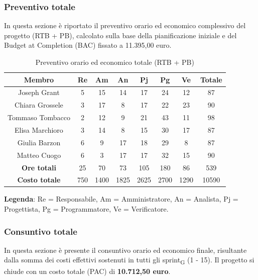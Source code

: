 \documentclass[11pt,a4paper]{article}
\newcommand{\gls}[1]{#1\textsubscript{G}}
\begin{document}
\subsubsection{Preventivo totale}
In questa sezione è riportato il preventivo orario ed economico complessivo del progetto (RTB + PB), calcolato sulla base della pianificazione iniziale e del Budget at Completion (BAC) fissato a 11.395,00 euro.

\begin{table}[H]
    \centering
    \begin{tabular}{|c|c|c|c|c|c|c|c|}
        \hline
        \textbf{Membro} & \textbf{Re} & \textbf{Am} & \textbf{An} & \textbf{Pj} & \textbf{Pg} & \textbf{Ve} & \textbf{Totale} \\
        \hline
        Joseph Grant & 5 & 15 & 14 & 17 & 24 & 12 & 87 \\
        Chiara Grossele & 3 & 17 & 8 & 17 & 22 & 23 & 90 \\
        Tommaso Tombacco & 2 & 12 & 9 & 21 & 43 & 11 & 98 \\
        Elisa Marchioro & 3 & 14 & 8 & 15 & 30 & 17 & 87 \\
        Giulia Barzon & 6 & 9 & 17 & 18 & 29 & 8 & 87 \\
        Matteo Cuogo & 6 & 3 & 17 & 17 & 32 & 15 & 90 \\
        \hline
        \textbf{Ore totali} & 25 & 70 & 73 & 105 & 180 & 86 & 539 \\
        \hline
        \textbf{Costo totale} & 750 & 1400 & 1825 & 2625 & 2700 & 1290 & 10590 \\
        \hline
    \end{tabular}
    \caption{Preventivo orario ed economico totale (RTB + PB)}
\end{table}

\textbf{Legenda}: Re = Responsabile, Am = Amministratore, An = Analista, Pj = Progettista, Pg = Programmatore, Ve = Verificatore.

\subsubsection{Consuntivo totale}
In questa sezione è presente il consuntivo orario ed economico finale, risultante dalla somma dei costi effettivi sostenuti in tutti gli \gls{sprint} (1 - 15). Il progetto si chiude con un costo totale (PAC) di \textbf{10.712,50 euro}.
\end{document}

